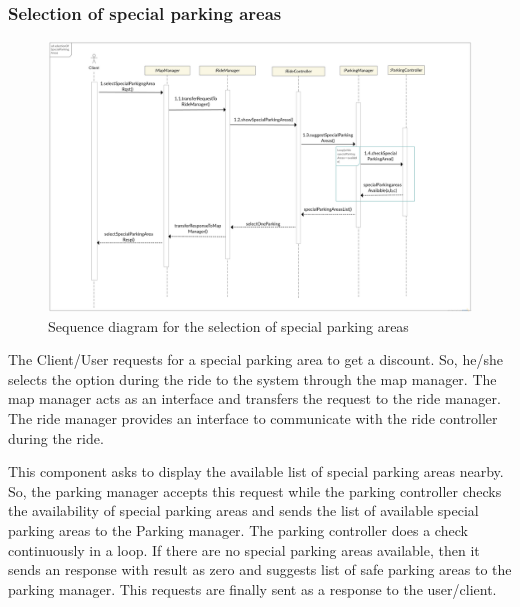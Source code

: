\subsubsection{Selection of special parking areas}
\begin{figure}[h]
	\centering
	\includegraphics[width=\linewidth,keepaspectratio]{figures/special_parking_area_runtime.eps}
	\caption{Sequence diagram for the selection of special parking areas}
	\label{fig:special_parking_area_runtime}
\end{figure}

The Client/User requests for a special parking area to get a discount. So, he/she selects the option during the ride to the system through the map manager. The map manager
acts as an interface and transfers the request to the ride manager. The ride manager provides an interface to communicate with the ride controller during the ride. 

This component asks to display the available list of special parking areas nearby. So, the parking manager accepts this request while the parking controller checks the availability of special parking areas and sends the list of available special parking areas to the Parking manager. The parking controller does a check continuously in a loop. If there are no special parking areas available, then it sends an response with result as zero and suggests list of safe parking areas to the parking manager. This requests are finally sent as a response to the user/client.

